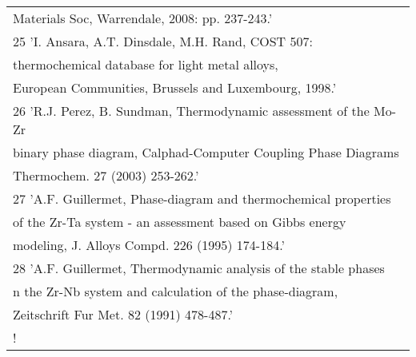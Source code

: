 \begin{longtable}[H]{ l l l }
	\multicolumn{3}{l}{Materials Soc, Warrendale, 2008: pp. 237-243.'}\\ 
	\multicolumn{3}{l}{25	  'I. Ansara, A.T. Dinsdale, M.H. Rand, COST 507:}\\ 
	\multicolumn{3}{l}{thermochemical database for light metal alloys,}\\ 
	\multicolumn{3}{l}{European Communities, Brussels and Luxembourg, 1998.'}\\
	\multicolumn{3}{l}{26	  'R.J. Perez, B. Sundman, Thermodynamic assessment of the Mo-Zr}\\
	\multicolumn{3}{l}{binary phase diagram, Calphad-Computer Coupling Phase Diagrams}\\ 
	\multicolumn{3}{l}{Thermochem. 27 (2003) 253-262.'}\\ 
	\multicolumn{3}{l}{27	  'A.F. Guillermet, Phase-diagram and thermochemical properties}\\
	\multicolumn{3}{l}{of the Zr-Ta system - an assessment based on Gibbs energy}\\ 
	\multicolumn{3}{l}{modeling, J. Alloys Compd. 226 (1995) 174-184.'}\\
	\multicolumn{3}{l}{28	  'A.F. Guillermet, Thermodynamic analysis of the stable phases}\\ 
	\multicolumn{3}{l}{n the Zr-Nb system and calculation of the phase-diagram,}\\ 
	\multicolumn{3}{l}{Zeitschrift Fur Met. 82 (1991) 478-487.'}\\   
	\multicolumn{3}{l}{!}\\
\end{longtable}